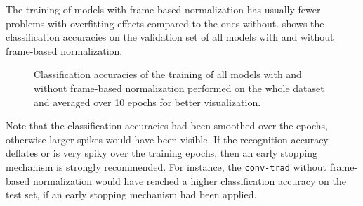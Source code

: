 \FloatBarrier
\noindent
The training of models with frame-based normalization has usually fewer problems with overfitting effects compared to the ones without.
 shows the classification accuracies on the validation set of all models with and without frame-based normalization.
\begin{figure}[!ht]
  \centering
  \quad
  \caption{Classification accuracies of the training of all models with and without frame-based normalization performed on the whole dataset and averaged over 10 epochs for better visualization.}
  \label{fig:exp_final_acc}
\end{figure}
\FloatBarrier
\noindent
Note that the classification accuracies had been smoothed over the epochs, otherwise larger spikes would have been visible.
If the recognition accuracy deflates or is very spiky over the training epochs, then an early stopping mechanism is strongly recommended.
For instance, the \texttt{conv-trad} without frame-based normalization would have reached a higher classification accuracy on the test set, if an early stopping mechanism had been applied.

